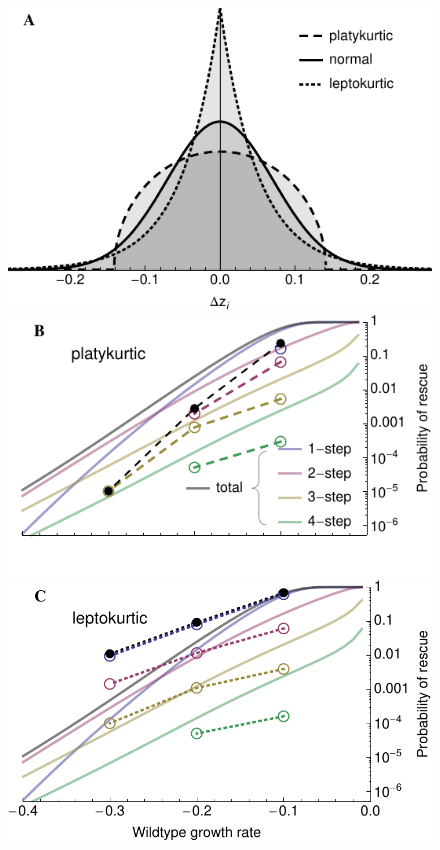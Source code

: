 \documentclass[9pt,twocolumn,twoside,lineno]{gsajnl}
\begin{document}
\begin{figure}[htbp]
\centering
\includegraphics[width=\linewidth]{mutational_distns.pdf}\\
\includegraphics[width=\linewidth]{platy_prob.pdf}\\
\includegraphics[width=\linewidth]{lepto_prob.pdf}\\

\end{figure}
\end{document}
